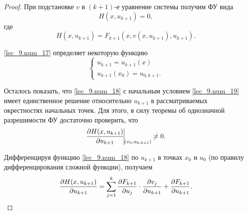 \documentclass[../../main.tex]{subfiles}
\begin{document}
\begin{proof}
    При подстановке $v$ в $(k+1)$-е уравнение системы
    получим ФУ вида
    \begin{equation}
        \label{lec_9.num_17}
        H(x, u_{k+1}) = 0,
    \end{equation}
    где
    \begin{equation}
        \label{lec_9.num_18}
        H(x, u_{k+1}) = 
        F_{k+1}\left(x, v(x, u_{k+1}), 
        u_{k+1}\right).
    \end{equation}
    
    \eqref{lec_9.num_17} определяет некоторую функцию
    \begin{equation}
        \label{lec_9.num_19}
        \begin{cases}
        u_{k+1} = u_{k+1}(x)\\
        u_{k+1}(x_0) = u_{0,k+1}.
        \end{cases}
    \end{equation}
    
    Осталось показать, что \eqref{lec_9.num_18} с начальным
    условием \eqref{lec_9.num_19} имеет единственное решение относительно 
    $u_{k+1}$ в рассматриваемых окрестностях начальных
    точек. Для этого, в силу теоремы об однозначной 
    разрешимости ФУ
    достаточно проверить, что
    \begin{equation}
    \label{lec_9.num_20}
    \pderiv{H(x, u_{k+1})}{u_{k+1}} 
    \vline\underset{\left(x_0, u_{0,k+1}\right)}{} \neq 0.
    \end{equation}
    
    Дифференцируя функцию \eqref{lec_9.num_18}
    по $u_{k+1}$ в точках $x_0$ и $u_0$ (по правилу
    дифференцирования сложной функции), получаем
    \begin{equation}
        \label{lec_9.num_22}
        \frac{\partial H(x, u_{k+1})}{\partial u_{k+1}}  =
        \sum_{j = 1}^{k}
        \frac{\partial F_{k+1}}{\partial u_j} \cdot \frac{\partial v_j}{\partial u_{k+1}} + 
        \frac{\partial F_{k+1}}{\partial u_{k+1}}.
    \end{equation}
    

\end{proof}
\end{document}
